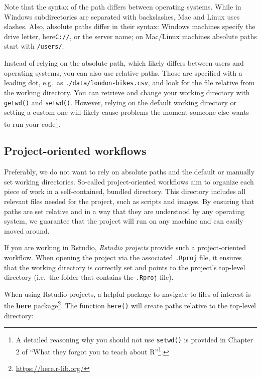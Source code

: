 \documentclass[
]{krantz}
\renewcommand{\href}[2]{#2\footnote{\url{#1}}}
\begin{document}
Note that the syntax of the path differs between operating systems. While in Windows subdirectories are separated with backslashes, Mac and Linux uses slashes. Also, absolute paths differ in their syntax: Windows machines specify the drive letter, here\texttt{C://}, or the server name; on Mac/Linux machines absolute paths start with \texttt{/users/}.

Instead of relying on the absolute path, which likely differs between users and operating systems, you can also use relative paths. Those are specified with a leading dot, e.g.~as \texttt{./data/london-bikes.csv}, and look for the file relative from the working directory. You can retrieve and change your working directory with \texttt{getwd()} and \texttt{setwd()}. However, relying on the default working directory or setting a custom one will likely cause problems the moment someone else wants to run your code\footnote{A detailed reasoning why you should not use \texttt{setwd()} is provided in \href{https://rstats.wtf/project-oriented-workflow.html}{Chapter 2 of ``What they forgot you to teach about R''}.}.

\hypertarget{workflows}{%
\subsection{Project-oriented workflows}\label{workflows}}

Preferably, we do not want to rely on absolute paths and the default or manually set working directories. So-called project-oriented workflows aim to organize each piece of work in a self-contained, bundled directory. This directory includes all relevant files needed for the project, such as scripts and images. By ensuring that paths are set relative and in a way that they are understood by any operating system, we guarantee that the project will run on any machine and can easily moved around.

If you are working in Rstudio, \emph{Rstudio projects} provide such a project-oriented workflow. When opening the project via the associated \texttt{.Rproj} file, it ensures that the working directory is correctly set and points to the project's top-level directory (i.e.~the folder that contains the \texttt{.Rproj} file).

When using Rstudio projects, a helpful package to navigate to files of interest is the \href{https://here.r-lib.org/}{\textbf{here} package}. The function \texttt{here()} will create paths relative to the top-level directory:
\end{document}
